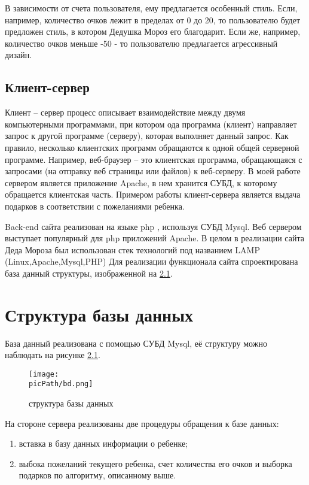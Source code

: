 \documentclass[oneside,final,14pt]{extreport}
\newcommand{\picPath}{pictures}
\begin{document}
В зависимости от счета пользователя, ему предлагается особенный стиль. Если, например, количество очков лежит в пределах от 0 до 	20, то пользователю будет предложен стиль, в котором Дедушка Мороз его благодарит. Если же, например, количество очков меньше -50 - то пользователю предлагается агрессивный дизайн. 

\section{Клиент-сервер}

Клиент – сервер процесс описывает взаимодействие между двумя компьютерными программами, при котором ода программа (клиент) направляет запрос к другой программе (серверу), которая выполняет данный запрос. Как правило, несколько клиентских программ обращаются к одной общей серверной программе. Например, веб-браузер – это клиентская программа, обращающаяся с запросами (на отправку веб страницы или файлов) к веб-серверу.
В моей работе сервером является приложение Apache, в нем хранится СУБД, к которому обращается клиентская часть.
Примером работы клиент-сервера является выдача подарков в соответствии с пожеланиями ребенка.



Back-end сайта реализован на языке php \cite{bib:php}, используя СУБД Mysql. Веб сервером выступает популярный для  php приложений Apache. В целом в реализации сайта Деда Мороза был использован стек технологий под названием LAMP (Linux,Apache,Mysql,PHP) Для реализации функционала сайта спроектирована база данный структуры, изображенной на \ref{bd}.
\chapter{Структура базы данных}

База данный реализована с помощью СУБД Mysql, её структуру можно наблюдать на рисунке \ref{bd}.

\begin{figure}[H]
\centering
	\texttt{[image: \\picPath/bd.png]}
	\caption{ структура базы данных }
  	\label{bd}

\end{figure}

На стороне сервера реализованы две процедуры обращения к базе данных: 
\begin{enumerate}
\item вставка в базу данных информации о ребенке; 
\item выбока пожеланий текущего ребенка, счет количества его очков и выборка подарков по алгоритму, описанному выше.
\end{enumerate}
\end{document}
